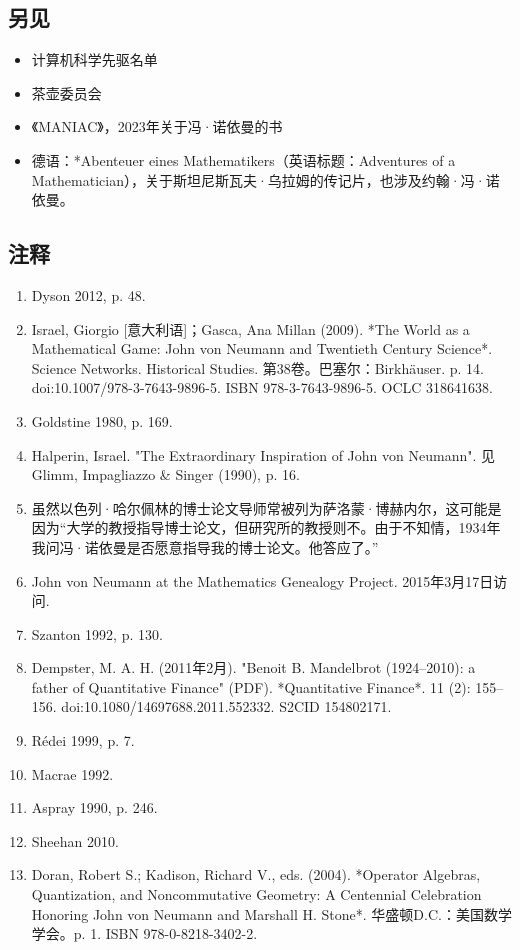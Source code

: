 \subsection{另见}  
\begin{itemize}
\item 计算机科学先驱名单  
\item 茶壶委员会  
\item 《MANIAC》，2023年关于冯·诺依曼的书  
\item 德语：*Abenteuer eines Mathematikers（英语标题：Adventures of a Mathematician），关于斯坦尼斯瓦夫·乌拉姆的传记片，也涉及约翰·冯·诺依曼。
\end{itemize}
\subsection{注释}  
\begin{enumerate}
\item Dyson 2012, p. 48.  
\item Israel, Giorgio [意大利语]；Gasca, Ana Millan (2009). *The World as a Mathematical Game: John von Neumann and Twentieth Century Science*. Science Networks. Historical Studies. 第38卷。巴塞尔：Birkhäuser. p. 14. doi:10.1007/978-3-7643-9896-5. ISBN 978-3-7643-9896-5. OCLC 318641638.  
\item Goldstine 1980, p. 169.  
\item Halperin, Israel. "The Extraordinary Inspiration of John von Neumann". 见Glimm, Impagliazzo & Singer (1990), p. 16.  
\item 虽然以色列·哈尔佩林的博士论文导师常被列为萨洛蒙·博赫内尔，这可能是因为“大学的教授指导博士论文，但研究所的教授则不。由于不知情，1934年我问冯·诺依曼是否愿意指导我的博士论文。他答应了。”  
\item John von Neumann at the Mathematics Genealogy Project. 2015年3月17日访问.  
\item Szanton 1992, p. 130.  
\item Dempster, M. A. H. (2011年2月). "Benoit B. Mandelbrot (1924–2010): a father of Quantitative Finance" (PDF). *Quantitative Finance*. 11 (2): 155–156. doi:10.1080/14697688.2011.552332. S2CID 154802171.  
\item Rédei 1999, p. 7.  
\item Macrae 1992.  
\item Aspray 1990, p. 246.  
\item Sheehan 2010.  
\item Doran, Robert S.; Kadison, Richard V., eds. (2004). *Operator Algebras, Quantization, and Noncommutative Geometry: A Centennial Celebration Honoring John von Neumann and Marshall H. Stone*. 华盛顿D.C.：美国数学学会。p. 1. ISBN 978-0-8218-3402-2.  

\end{enumerate}
